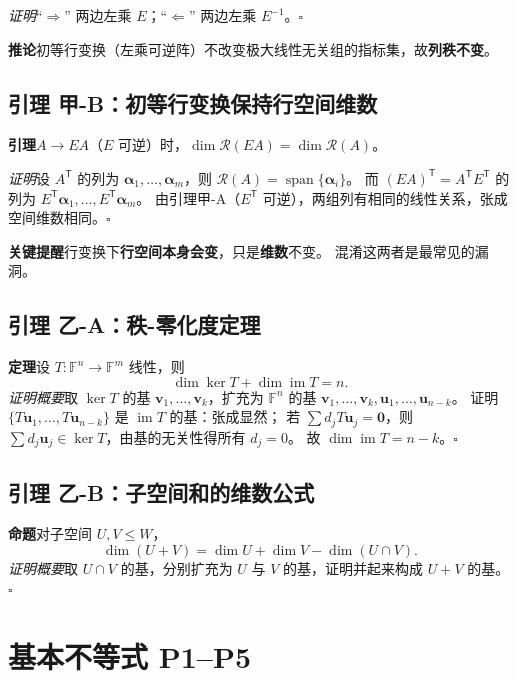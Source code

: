 \documentclass[11pt]{ctexart}
\newcommand{\im}{\operatorname{im}}
\newcommand{\F}{\mathbb{F}}
\newcommand{\T}{^{\mathsf T}}
\begin{document}
\emph{证明}\quad ``$\Rightarrow$'' 两边左乘 $E$；``$\Leftarrow$'' 两边左乘 $E^{-1}$。\hfill$\square$

\textbf{推论}\quad 初等行变换（左乘可逆阵）不改变极大线性无关组的指标集，故\textbf{列秩不变}。

\subsection{引理 甲-B：初等行变换保持行空间维数}
\textbf{引理}\quad $A\to EA$（$E$ 可逆）时，$\dim\mathcal R(EA)=\dim\mathcal R(A)$。

\emph{证明}\quad 设 $A\T$ 的列为 $\boldsymbol\alpha_1,\dots,\boldsymbol\alpha_m$，则 $\mathcal R(A)=\operatorname{span}\{\boldsymbol\alpha_i\}$。
而 $(EA)\T=A\T E\T$ 的列为 $E\T\boldsymbol\alpha_1,\dots,E\T\boldsymbol\alpha_m$。
由引理甲-A（$E\T$ 可逆），两组列有相同的线性关系，张成空间维数相同。\hfill$\square$

\begin{warnbox}
\textbf{关键提醒}\quad 行变换下\textbf{行空间本身会变}，只是\textbf{维数}不变。
混淆这两者是最常见的漏洞。
\end{warnbox}

\subsection{引理 乙-A：秩-零化度定理}
\textbf{定理}\quad 设 $T:\F^n\to\F^m$ 线性，则
\[
\dim\ker T+\dim\im T=n .
\]
\emph{证明概要}\quad 取 $\ker T$ 的基 $\mathbf v_1,\dots,\mathbf v_k$，扩充为 $\F^n$ 的基
$\mathbf v_1,\dots,\mathbf v_k,\mathbf u_1,\dots,\mathbf u_{n-k}$。
证明 $\{T\mathbf u_1,\dots,T\mathbf u_{n-k}\}$ 是 $\im T$ 的基：张成显然；
若 $\sum d_jT\mathbf u_j=\mathbf 0$，则 $\sum d_j\mathbf u_j\in\ker T$，由基的无关性得所有 $d_j=0$。
故 $\dim\im T=n-k$。\hfill$\square$

\subsection{引理 乙-B：子空间和的维数公式}
\textbf{命题}\quad 对子空间 $U,V\le W$，
\[
\dim(U+V)=\dim U+\dim V-\dim(U\cap V).
\]
\emph{证明概要}\quad 取 $U\cap V$ 的基，分别扩充为 $U$ 与 $V$ 的基，证明并起来构成 $U+V$ 的基。\hfill$\square$

\section{基本不等式 P1--P5}
\end{document}
